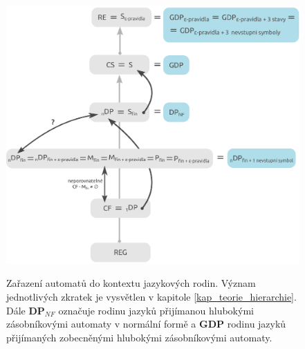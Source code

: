 \begin{figure}[ht]
\centering
\includegraphics{img/bp_hierarchy03.eps} \bigskip \\
\caption{Zařazení automatů do kontextu jazykových rodin. Význam jednotlivých zkratek je vysvětlen v kapitole \ref{kap_teorie_hierarchie}. Dále \textbf{DP${}_{NF}$} označuje rodinu jazyků přijímanou hlubokými zásobníkovými automaty v normální formě a \textbf{GDP} rodinu jazyků přijímaných zobecněnými hlubokými zásobníkovými automaty.}
\label{obr_model02_hierarchy}
\end{figure}



